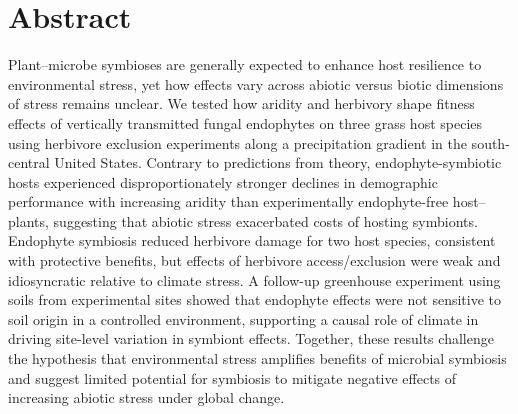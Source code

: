\documentclass[12pt]{article}\usepackage[]{graphicx}\usepackage[dvipsnames]{xcolor}
\begin{document}
\section*{Abstract}
Plant–microbe symbioses are generally expected to enhance host resilience to environmental stress, yet how effects vary across abiotic versus biotic dimensions of stress remains unclear. 
We tested how aridity and herbivory shape fitness effects of vertically transmitted fungal endophytes on three grass host species using herbivore exclusion experiments along a precipitation gradient in the south-central United States. 
Contrary to predictions from theory, endophyte-symbiotic hosts experienced disproportionately stronger declines in demographic performance with increasing aridity than experimentally endophyte-free host–plants, suggesting that abiotic stress exacerbated costs of hosting symbionts. 
Endophyte symbiosis reduced herbivore damage for two host species, consistent with protective benefits, but effects of herbivore access/exclusion were weak and idiosyncratic relative to climate stress. 
A follow-up greenhouse experiment using soils from experimental sites showed that endophyte effects were not sensitive to soil origin in a controlled environment, supporting a causal role of climate in driving site-level variation in symbiont effects. 
Together, these results challenge the hypothesis that environmental stress amplifies benefits of microbial symbiosis and suggest limited potential for symbiosis to mitigate negative effects of increasing abiotic stress under global change. 

\newpage
\end{document}
